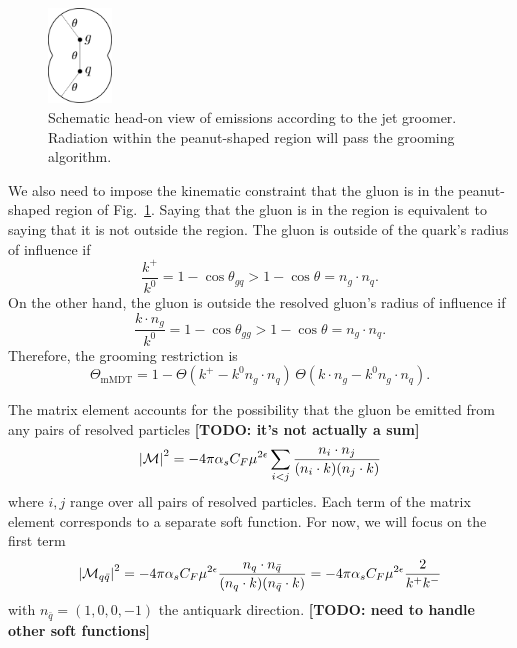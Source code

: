 \documentclass[11pt,twoside,reqno]{amsart}
\theoremstyle{plain}
\theoremstyle{remark}
\theoremstyle{definition}
\theoremstyle{remark}
\theoremstyle{definition}
\theoremstyle{definition}
\newcommand{\cM}{\mathcal{M}}
\newcommand{\mMDT}{\mathrm{mMDT}}
\begin{document}
	\begin{figure}\label{fig:schematic}
		\includegraphics[width=0.15\textwidth]{figures/head_on_schematic.pdf}
		\caption{Schematic head-on view of emissions according to the jet groomer. Radiation within the peanut-shaped region will pass the grooming algorithm.}
	\end{figure}

	We also need to impose the kinematic constraint that the gluon is in the peanut-shaped region of Fig.~\ref{fig:schematic}. Saying that the gluon is in the region is equivalent to saying that it is not outside the region. The gluon is outside of the quark's radius of influence if
	\begin{equation}
		\frac{k^+}{k^0} = 1 - \cos\theta_{gq} > 1 - \cos\theta = n_g \cdot n_q.
	\end{equation}
	On the other hand, the gluon is outside the resolved gluon's radius of influence if
	\begin{equation}
		\frac{k \cdot n_g}{k^0} = 1 - \cos\theta_{gg} > 1 - \cos\theta = n_g \cdot n_q.
	\end{equation}
	Therefore, the grooming restriction is
	\begin{equation}
		\Theta_{\mMDT} = 1 - \Theta(k^+ - k^0 n_g \cdot n_q)\,\Theta(k \cdot n_g - k^0 n_g \cdot n_q).
	\end{equation}

	The matrix element accounts for the possibility that the gluon be emitted from any pairs of resolved particles {\color{red}\textbf{[TODO: it's not actually a sum]}}
	\begin{equation}
		\abs{\cM}^2 = -4\pi\alpha_s C_F \mu^{2\epsilon}\sum_{i < j} \frac{n_i \cdot n_j}{(n_i \cdot k)(n_j \cdot k)}
	\end{equation}
	where $i, j$ range over all pairs of resolved particles. Each term of the matrix element corresponds to a separate soft function. For now, we will focus on the first term \cite{catani_infrared_2000}
	\begin{equation}
		\abs{\cM_{q\bar q}}^2 = -4\pi\alpha_s C_F \mu^{2\epsilon}\frac{n_q \cdot n_{\bar q}}{(n_q \cdot k)(n_{\bar q}\cdot k)} = -4\pi\alpha_s C_F \mu^{2\epsilon}\frac{2}{k^+ k^-}
	\end{equation}
	with $n_{\bar q} = (1, 0, 0, -1)$ the antiquark direction. {\color{red}\textbf{[TODO: need to handle other soft functions]}}
\end{document}
